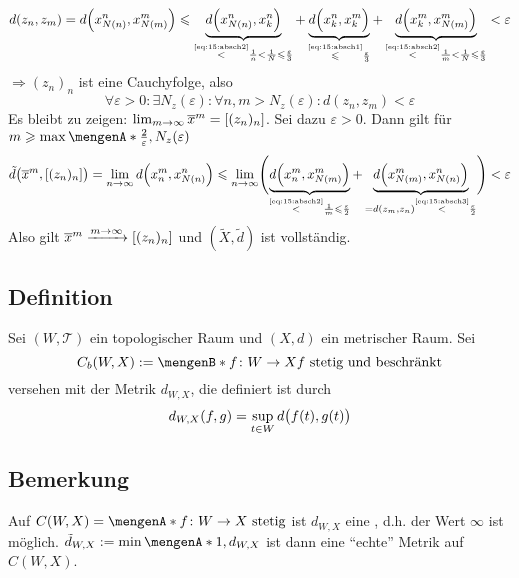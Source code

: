\begin{description}
\begin{description}
\begin{align*}
		d(z_n,z_m) = d \enbrace*{x^n_{N(n)}, x^m_{N(m)}} \le 
		\underbrace{d\enbrace*{x^n_{N(n)}, x^n_k}}_{\stackrel{\mbox{\tiny\eqref{eq:15:absch2}}}{<} \frac{1}{n} < \frac{1}{N} \le \frac{\varepsilon}{3}} + 
		\underbrace{d\enbrace[\Big]{x^n_k, x^m_k}}_{\stackrel{\mbox{\tiny\eqref{eq:15:absch1}}}{\le} \frac{\varepsilon}{3}}   + 
		\underbrace{d\enbrace*{x^m_k, x^m_{N(m)}}}_{\stackrel{\mbox{\tiny\eqref{eq:15:absch2}}}{<} \frac{1}{m} < \frac{1}{N} \le \frac{\varepsilon}{3}} 
		< \varepsilon
	\end{align*}
	$\Rightarrow (z_n)_n$ ist eine Cauchyfolge, also 
	\begin{equation*}
		\forall \varepsilon>0 : \exists N_z(\varepsilon) : \forall n,m > N_z(\varepsilon)  : d(z_n,z_m) < \varepsilon  \label{eq:15:absch3} \tag{\#}
	\end{equation*}
	Es bleibt zu zeigen: $\lim_{m \to \infty} \overline{x}^m = \benbrace*{(z_n)_n}$. Sei dazu $\varepsilon>0$. Dann gilt für 
	$m \ge \max \set{\frac{2}{\varepsilon}, N_z(\varepsilon)}$
	\begin{align*}
		\tilde{d} \enbrace[\big]{\overline{x}^m, \benbrace*{(z_n)_n}} = \lim_{ n \to \infty} d \enbrace*{x^m_n, x^n_{N(n)}}\le \lim_{ n \to \infty} 
		\enbrace[\Bigg]{ \underbrace{d\enbrace*{x_n^m, x^m_{N(m)}}}_{\stackrel{\mbox{\tiny\eqref{eq:15:absch2}}}{<} \frac{1}{m} \le \frac{\varepsilon}{2}  } +
		\underbrace{d\enbrace*{x^m_{N(m)}, x^n_{N(n)}}}_{=d(z_m,z_n) \stackrel{\mbox{\tiny\eqref{eq:15:absch3}}}{<} \frac{\varepsilon}{2} } } < \varepsilon
	\end{align*}
	Also gilt $\overline{x}^m \xrightarrow{m \to \infty} \benbrace*{(z_n)_n}$ und $(\tilde{X},\tilde{d})$ ist vollständig. \bewende
	\end{description}
\end{description}

\subsection[Definition: Raum der beschränkten, stetigen Abbildungen]{Definition} %
\label{sub:16}
Sei $(W,\mathcal{T})$ ein topologischer Raum und $(X,d)$ ein metrischer Raum. Sei 
\[
	C_b(W,X) := \set[f \colon W \to X]{f \text{ stetig und beschränkt}} 
\]
versehen mit der Metrik $d_{W,X}$, die definiert ist durch
\[
	d_{W,X}(f,g) = \sup_{t \in W} d \enbrace[\big]{f(t), g(t)} 
\]

\subsection[Bemerkung: $d_{W,X}$ als Metrik auf $C(W,X)$]{Bemerkung} %
\label{sub:17}
Auf $C(W,X) = \set{f \colon W \to X \text{ stetig}} $ ist $d_{W,X}$ eine , d.h. der Wert $\infty$ ist möglich.
$\tilde{d}_{W,X} := \min \set{1, d_{W,X}} $ ist dann eine \enquote{echte} Metrik auf $C(W,X)$.

